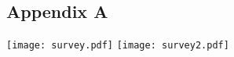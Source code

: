 \documentclass[draft,final]{vutinfth} %
\begin{document}
\begin{abstract}
\end{abstract}


\tableofcontents %

\mainmatter





 









%





% 

\backmatter

\listoffigures %

\cleardoublepage %
\listoftables %







\begin{appendices}
	\chapter{Appendix A}
	\label{chap:appendixA}
	\texttt{[image: survey.pdf]}
	\texttt{[image: survey2.pdf]}
\end{appendices}
\end{document}
